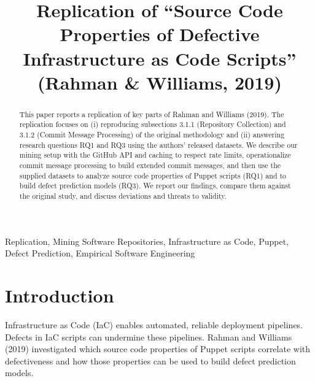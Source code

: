 \documentclass[conference]{IEEEtran}
\begin{document}
	
	\title{Replication of ``Source Code Properties of Defective Infrastructure as Code Scripts'' (Rahman \& Williams, 2019)\\
	}
	
	\author{
		\and
		\and
		\and
	}
	
	\maketitle
	
	\begin{abstract}
		This paper reports a replication of key parts of Rahman and Williams (2019). The replication focuses on (i) reproducing subsections 3.1.1 (Repository Collection) and 3.1.2 (Commit Message Processing) of the original methodology and (ii) answering research questions RQ1 and RQ3 using the authors' released datasets. We describe our mining setup with the GitHub API and caching to respect rate limits, operationalize commit message processing to build extended commit messages, and then use the supplied datasets to analyze source code properties of Puppet scripts (RQ1) and to build defect prediction models (RQ3). We report our findings, compare them against the original study, and discuss deviations and threats to validity.
	\end{abstract}
	
	\begin{IEEEkeywords}
		Replication, Mining Software Repositories, Infrastructure as Code, Puppet, Defect Prediction, Empirical Software Engineering
	\end{IEEEkeywords}
	
	\section{Introduction}
	Infrastructure as Code (IaC) enables automated, reliable deployment pipelines. Defects in IaC scripts can undermine these pipelines. Rahman and Williams (2019) investigated which source code properties of Puppet scripts correlate with defectiveness and how those properties can be used to build defect prediction models. 
	
\end{document}
